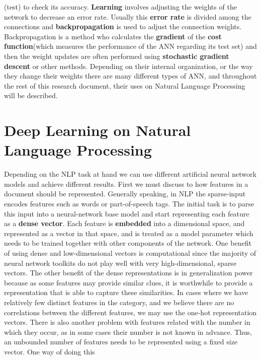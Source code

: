 \documentclass{scrartcl}
\begin{document}
    (test) to check its accuracy. 
    \textbf{Learning} involves adjusting the weights of the network 
    to decrease an error rate. Usually this \textbf{error rate} is divided among the connections and 
    \textbf{backpropagation} is used to adjust the connection weights. Backpropagation is a method
    who calculates the \textbf{gradient} of the \textbf{cost function}(which measures the performance
    of the ANN regarding its test set) and then the weight updates are often performed using
    \textbf{stochastic gradient descent} or other methods.
    Depending on their internal organization, or the way they change their weights there are many
    different types of ANN, and throughout the rest of this research document, their uses on
    Natural Language Processing will be described.
    \section{ Deep Learning on Natural Language Processing }
    Depending on the NLP task at hand we can use different artificial neural network models and
    achieve different results.
    First we must discuss to how features in a document should be represented. \newline
    Generally speaking, in NLP the sparse-input encodes features such as words
    or part-of-speech tags. The initial task is to parse this input into a neural-network
    base model and start representing each feature as a \textbf{dense vector}. 
    Each feature is \textbf{embedded} into a dimensional space, and represented as a vector in 
    that space, and is treated as a model parameter which needs to be trained together 
    with other components of the network.
    One benefit of using dense and low-dimensional vectors is computational since
    the majority of neural network toolkits do not play well with very high-dimensional, sparse  
    vectors. The other benefit of the dense representations is in generalization power because 
    as some features may provide similar clues, it is worthwhile to provide a representation that
    is able to capture these similarities. \newline
    In cases where we have relatively few distinct features in the category, and we believe
    there are no correlations between the different features,
    we may use the one-hot representation vectors.
    There is also another problem with features related with the number in which they occur, as 
    in some cases their number is not known in advance. Thus, an unbounded 
    number of features needs to be represented using a fixed size vector. One way of doing this
\end{document}
